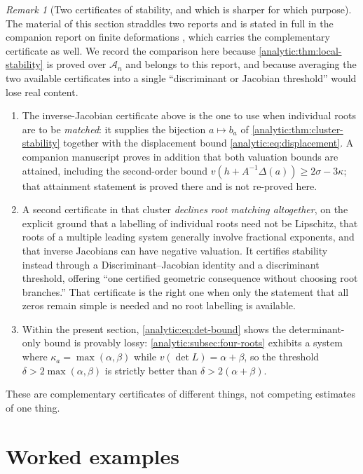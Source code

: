 \documentclass[11pt,letterpaper]{article}
\theoremstyle{definition}
\theoremstyle{remark}
\newtheorem{remark}[theorem]{Remark}
\newcommand{\A}{\mathscr A}
\numberwithin{equation}{section}
\begin{document}
\begin{remark}[Two certificates of stability, and which is sharper for
which purpose]\label{analytic:rem:two-certificates}
The material of this section straddles two reports and is stated in full in
the companion report on finite deformations \cite{FiniteDeformations},
which carries the complementary certificate as well. We record the
comparison here because \cref{analytic:thm:local-stability} is proved over
$\A_n$ and belongs to this report, and because averaging the two available
certificates into a single ``discriminant or Jacobian threshold'' would lose
real content.
\begin{enumerate}
\item The inverse-Jacobian certificate above is the one to use when
individual roots are to be \emph{matched}: it supplies the bijection
$a\mapsto b_a$ of \cref{analytic:thm:cluster-stability} together with the
displacement bound \eqref{analytic:eq:displacement}. A companion manuscript
proves in addition that both valuation bounds are attained, including the
second-order bound $v(h+A^{-1}\Delta(a))\ge2\sigma-3\kappa$; that
attainment statement is proved there and is not re-proved here.
\item A second certificate in that cluster \emph{declines root matching
altogether}, on the explicit ground that a labelling of individual roots
need not be Lipschitz, that roots of a multiple leading system generally
involve fractional exponents, and that inverse Jacobians can have negative
valuation. It certifies stability instead through a Discriminant--Jacobian
identity and a discriminant threshold, offering ``one certified geometric
consequence without choosing root branches.'' That certificate is the right
one when only the statement that all zeros remain simple is needed and no
root labelling is available.
\item Within the present section, \eqref{analytic:eq:det-bound} shows the
determinant-only bound is provably lossy:
\cref{analytic:subsec:four-roots} exhibits a system where
$\kappa_a=\max(\alpha,\beta)$ while $v(\det L)=\alpha+\beta$, so the
threshold $\delta>2\max(\alpha,\beta)$ is strictly better than
$\delta>2(\alpha+\beta)$.
\end{enumerate}
These are complementary certificates of different things, not competing
estimates of one thing.
\end{remark}

\section{Worked examples}\label{analytic:sec:example}
\end{document}
